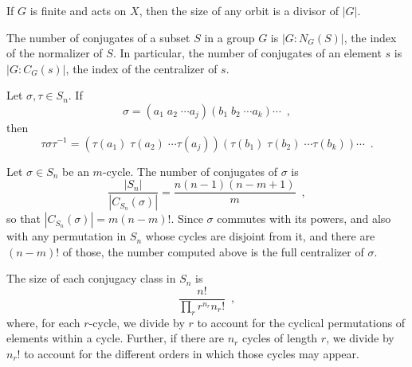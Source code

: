 \begin{corollary} \cite[103]{Rotman1967} If $G$ is finite and acts on $X$, then the size of any orbit is a divisor of $|G|$.
\end{corollary}

\begin{proposition} \cite[123]{DummitFoote2004} The number of conjugates of a subset $S$ in a group $G$ is $|G : N_G(S)|$,  the index of the normalizer of $S$. In particular, the number of conjugates of an element $s$ is $|G : C_G(s)|$, the index of the centralizer of $s$.
\end{proposition}

\begin{proposition} \cite[125]{DummitFoote2004} Let $\sigma, \tau \in S_n$. If
$$
\sigma = (a_1 \; a_2 \; \cdots a_j) (b_1 \; b_2 \; \cdots a_k) \cdots \enspace,
$$
then
$$
\tau \sigma \tau^{-1} = (\tau(a_1) \; \tau(a_2) \; \cdots \tau(a_j)) (\tau(b_1) \; \tau(b_2) \; \cdots \tau(b_k)) \cdots \enspace.
$$
\end{proposition}

\begin{example} \cite[127]{DummitFoote2004} Let $\sigma \in S_n$ be an $m$-cycle. The number of conjugates of $\sigma$ is
$$
\frac{|S_n|}{|C_{S_n}(\sigma)|} = \frac{n (n - 1) (n - m + 1)}{m} \enspace,
$$
so that $|C_{S_n}(\sigma)| = m (n - m)!$. Since $\sigma$ commutes with its powers, and also with any permutation in $S_n$ whose cycles are disjoint from it, and there are $(n - m)!$ of those, the number computed above is the full centralizer of $\sigma$.
\end{example}

\begin{example} \cite[132]{DummitFoote2004} The size of each conjugacy class in $S_n$ is
$$
\frac{n!}{\prod_{r}r^{n_r}n_r!} \enspace,
$$
where, for each $r$-cycle, we divide by $r$ to account for the cyclical permutations of elements within a cycle. Further, if there are $n_r$ cycles of length $r$, we divide by $n_r!$ to account for the different orders in which those cycles may appear.
\end{example}

